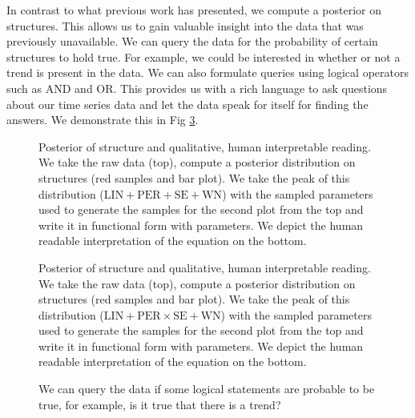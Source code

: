 In contrast to what previous work has presented, we compute a posterior on structures. This allows us to gain valuable insight into the data that was previously unavailable. 
We can query the data for the probability of certain structures to hold true. For example, we could be interested in whether or not a trend is present in the data.
We can also formulate queries using logical operators such as AND and OR. This provides us with a rich language to ask questions about our time series data and let the data speak for itself for finding the answers. We demonstrate this in Fig \ref{fig:query}.

\begin{figure}
\centering

\caption{\small Posterior of structure and qualitative, human interpretable reading. We take the raw data (top), compute a posterior distribution on structures (red samples and bar plot).
We take the peak of this distribution ($\text{LIN}+\text{PER}+\text{SE}+\text{WN}$) with the sampled parameters used to generate the samples for the second plot from the top and write it in functional form with parameters. We depict the human readable interpretation of the equation on the bottom.}\label{fig:posterior}
\end{figure}

\begin{figure}
\centering

\caption{\small Posterior of structure and qualitative, human interpretable reading. We take the raw data (top), compute a posterior distribution on structures (red samples and bar plot).
We take the peak of this distribution ($\text{LIN}+\text{PER} \times \text{SE}+\text{WN}$) with the sampled parameters used to generate the samples for the second plot from the top and write it in functional form with parameters. We depict the human readable interpretation of the equation on the bottom.}\label{fig:posterior_airline}
\end{figure}

\begin{figure}
\centering

\caption{We can query the data if some logical statements are probable to be true, for example, is it true that there is a trend?}\label{fig:query}
\end{figure}
